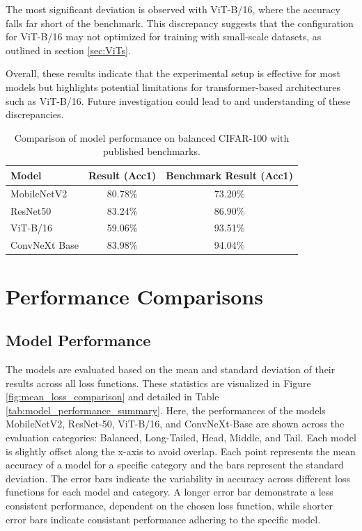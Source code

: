 The most significant deviation is observed with ViT-B/16, where the accuracy falls far short of the benchmark. This discrepancy suggests that the configuration for ViT-B/16 may not optimized for training with small-scale datasets, as outlined in section \ref{sec:ViTs}. 

Overall, these results indicate that the experimental setup is effective for most models but highlights potential limitations for transformer-based architectures such as ViT-B/16. Future investigation could lead to and understanding of these discrepancies.

\begin{table}[H]
    \centering
    \caption{Comparison of model performance on balanced CIFAR-100 with published benchmarks.}
    \begin{tabular}{|l|c|c|}
    \hline
    \textbf{Model}        & \textbf{Result (Acc1)} & \textbf{Benchmark Result (Acc1)}  \\ \hline
    MobileNetV2           & 80.78\%               & 73.20\% \cite{park2022bitatneuralnetworkbinarization}  \\ \hline
    ResNet50            & 83.24\%               & 86.90\% \cite{wightman2021resnetstrikesbackimproved}  \\ \hline
    ViT-B/16              & 59.06\%               & 93.51\% \cite{ye2023partialfinetuningsuccessorfinetuning} \\ \hline
    ConvNeXt Base         & 83.98\%               & 94.04\% \cite{ye2023partialfinetuningsuccessorfinetuning}  \\ \hline
    \end{tabular}
    \label{tab:benchmark_comparison}
\end{table}



\section{Performance Comparisons}
\subsection{Model Performance}
The models are evaluated based on the mean and standard deviation of their results across all loss functions. These statistics are visualized in Figure \ref{fig:mean_loss_comparison} and detailed in Table \ref{tab:model_performance_summary}. Here, the performances of the models MobileNetV2, ResNet-50, ViT-B/16, and ConvNeXt-Base are shown across the evaluation categories: Balanced, Long-Tailed, Head, Middle, and Tail. Each model is slightly offset along the x-axis to avoid overlap. Each point represents the mean accuracy of a model for a specific category and the bars represent the standard deviation. The error bars indicate the variability in accuracy across different loss functions for each model and category. A longer error bar demonstrate a less consistent performance, dependent on the chosen loss function, while shorter error bars indicate consistant performance adhering to the specific model.

